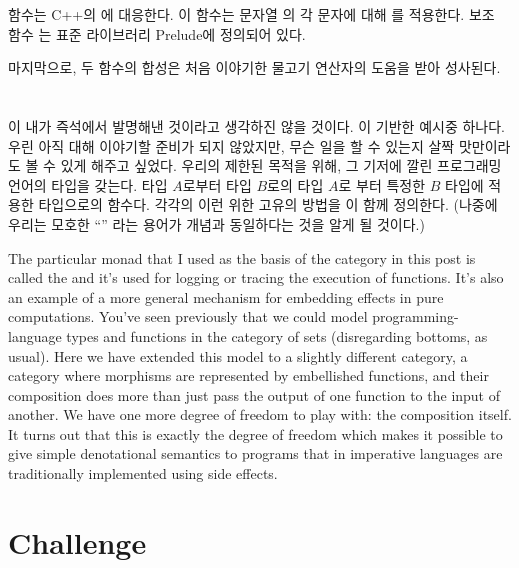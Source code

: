  함수는 C++의 에 대응한다. 이 함수는 문자열 의 각 문자에 대해 를 적용한다.
보조 함수 는 표준 라이브러리 Prelude에 정의되어 있다.

마지막으로, 두 함수의 합성은 처음 이야기한 물고기 연산자의 도움을 받아 성사된다.


\section{\trKleisli \trCategory}

이  내가 즉석에서 발명해낸 것이라고 생각하진 않을 것이다.
이   기반한  \trKleisli{} 예시중 하나다.
우린 아직  대해 이야기할 준비가 되지 않았지만,  무슨 일을 할 수 있는지 살짝 맛만이라도 볼 수 있게 해주고 싶었다.
우리의 제한된 목적을 위해, \trKleisli{} 그 기저에 깔린 프로그래밍 언어의 타입을  갖는다.
타입 $A$로부터 타입 $B$로의  타입 $A$로 부터 특정한  $B$ 타입에 적용한 타입으로의 함수다. 
각각의 \trKleisli{} 이런   위한 고유의 방법을 이   함께 정의한다.
(나중에 우리는 모호한 ``\trEmbellish'' 라는 용어가   개념과 동일하다는 것을 알게 될 것이다.)

The particular monad that I used as the basis of the category in this
post is called the  and it's used for logging or
tracing the execution of functions. It's also an example of a more
general mechanism for embedding effects in pure computations. You've
seen previously that we could model programming-language types and
functions in the category of sets (disregarding bottoms, as usual). Here
we have extended this model to a slightly different category, a category
where morphisms are represented by embellished functions, and their
composition does more than just pass the output of one function to the
input of another. We have one more degree of freedom to play with: the
composition itself. It turns out that this is exactly the degree of
freedom which makes it possible to give simple denotational semantics to
programs that in imperative languages are traditionally implemented
using side effects.

\section{Challenge}

